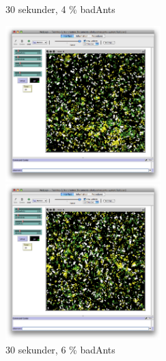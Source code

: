 \documentclass[titlepage, a4paper, 12pt]{article}
\begin{document}
\begin{figure}
  \begin{minipage}[b]{0.5\linewidth} %
    \centering
    \caption{30 sekunder, 4 \% badAnts}
    \includegraphics[width=6cm]{images/20-bad-30.png}
  \end{minipage}
  \hspace{0.5cm} %
  \begin{minipage}[b]{0.5\linewidth}
    \centering
    \caption{30 sekunder, 6 \% badAnts}
    \includegraphics[width=6cm]{images/30-bad-30.png}
  \end{minipage}


\end{figure}
\end{document}
